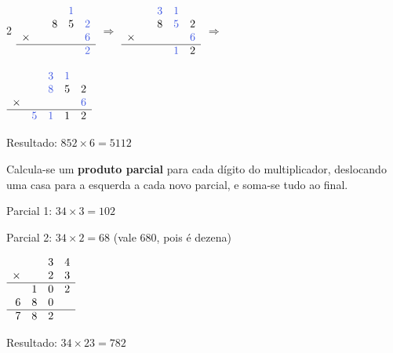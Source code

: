 \documentclass[12pt,twoside]{article}
\begin{document}
\begin{multicols}{2}
$\begin{array}{rrrrr}
&&&\textcolor{iris}{1}&\\
&&8&5&\textcolor{iris}{2}\\
\times &&&&\textcolor{iris}{6}\\
\hline
&&&&\textcolor{iris}{2}\\
\end{array}$
$\Rightarrow$
$\begin{array}{rrrrr}
&&\textcolor{iris}{3}&\textcolor{iris}{1}&\\
&&8&\textcolor{iris}{5}&2\\
\times &&&&\textcolor{iris}{6}\\
\hline
&&&\textcolor{iris}{1}&2\\
\end{array}$
$\Rightarrow$

\vspace{0.2cm}
$\begin{array}{rrrrr}
&&\textcolor{iris}{3}&\textcolor{iris}{1}&\\
&&\textcolor{iris}{8}&5&2\\
\times &&&&\textcolor{iris}{6}\\
\hline
&\textcolor{iris}{5}&\textcolor{iris}{1}&1&2\\
\end{array}$

\vspace{4pt}
Resultado: $852 \times 6 = 5112$


Calcula-se um \textbf{produto parcial} para cada dígito do multiplicador, deslocando uma casa para a esquerda a cada novo parcial, e soma-se tudo ao final.


Parcial 1: $34 \times 3 = 102$

Parcial 2: $34 \times 2 = 68$ (vale $680$, pois é dezena)

\vspace{0.3cm}
$\begin{array}{rrrr}
&&3&4\\
\times &&2&3\\
\hline
&1&0&2\\
6&8&0&\\
\hline
7&8&2&
\end{array}$

\vspace{4pt}
Resultado: $34 \times 23 = 782$


\end{multicols}
\end{document}
